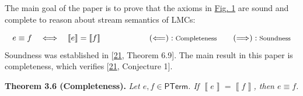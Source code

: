 \hypertarget{html:S3.SS0.SSS0.Px2.p2}{} The main goal of the paper is to prove that the axioms in \hyperlink{html:S3.F1}{Fig. 1} are sound and complete to reason about stream semantics of LMCs:
\par\medskip
\hypertarget{html:S3.Ex11}{}   %
\hypertarget{html:S3.Ex11.m1}{}\[e\equiv f\quad\Longleftrightarrow\quad\llbracket e\rrbracket=\llbracket f\rrbracket\qquad\qquad\qquad(\Longleftarrow):{\text{\footnotesize Completeness}}\qquad(\Longrightarrow):{\text{\footnotesize Soundness}}\]    Soundness was established in [\hyperlink{html:bib.bib21}{21}, Theorem 6.9]. The main result in this paper is completeness, which verifies [\hyperlink{html:bib.bib21}{21}, Conjecture 1].
\par\medskip
\hypertarget{html:S3.Thmtheorem6}{} \par\noindent\textbf{\textbf{Theorem 3.6}\textbf{ }(Completeness)\textbf{.}}\quad  %
\hypertarget{html:S3.Thmtheorem6.p1}{} \emph{Let %
\hypertarget{html:S3.Thmtheorem6.p1.m1}{}\({e,f\in\mathsf{PTerm}}\). If %
\hypertarget{html:S3.Thmtheorem6.p1.m2}{}\({\left\llbracket{e}\right\rrbracket=\left\llbracket{f}\right\rrbracket}\), then %
\hypertarget{html:S3.Thmtheorem6.p1.m3}{}\({e\equiv f}\).}
\par\medskip
    

